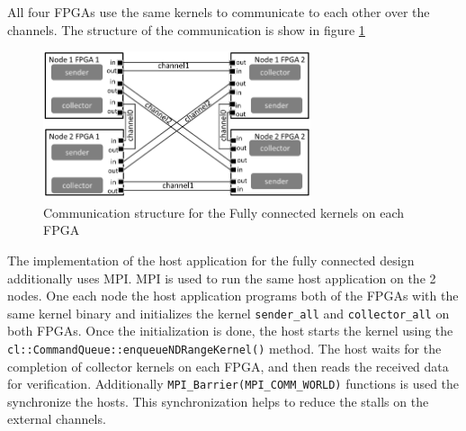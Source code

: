 All four FPGAs use the same kernels to communicate to each other over the channels.
The structure of the communication is show in figure \ref{fig:fc_struc}

\begin{figure}[h]%
    \centering
    \includegraphics[width=0.7\textwidth]{images/fc_struc}
    \caption{Communication structure for the Fully connected kernels on each FPGA}
    \label{fig:fc_struc}
\end{figure}

The implementation of the host application for the fully connected design additionally
uses MPI. MPI is used to run the same host application on the 2 nodes. One each node
the host application programs both of the FPGAs with the same kernel binary and initializes
the kernel \texttt{sender\_all} and \texttt{collector\_all} on both FPGAs. Once the initialization
is done, the host starts the kernel using the \texttt{cl::CommandQueue::enqueueNDRangeKernel()}
method. The host waits for the completion of collector kernels on each FPGA, and then reads
the received data for verification. Additionally \texttt{MPI\_Barrier(MPI\_COMM\_WORLD)} functions
is used the synchronize the hosts. This synchronization helps to reduce the stalls
on the external channels.



